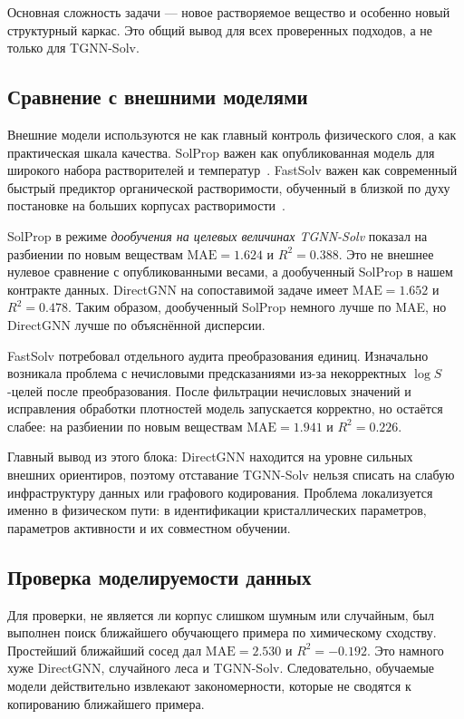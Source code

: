 \documentclass[11pt]{article}
\newcommand{\mae}{\mathrm{MAE}}
\newcommand{\Rtwo}{R^2}
\theoremstyle{definition}
\begin{document}
Основная сложность задачи --- новое растворяемое вещество и особенно новый структурный каркас. Это общий вывод для всех проверенных подходов, а не только для TGNN-Solv.

\subsection{Сравнение с внешними моделями}

Внешние модели используются не как главный контроль физического слоя, а как практическая шкала качества. SolProp важен как опубликованная модель для широкого набора растворителей и температур~\cite{vermeire2022}. FastSolv важен как современный быстрый предиктор органической растворимости, обученный в близкой по духу постановке на больших корпусах растворимости~\cite{fastsolv2025}.

SolProp в режиме \emph{дообучения на целевых величинах TGNN-Solv} показал на разбиении по новым веществам $\mae=1.624$ и $\Rtwo=0.388$. Это не внешнее нулевое сравнение с опубликованными весами, а дообученный SolProp в нашем контракте данных. DirectGNN на сопоставимой задаче имеет $\mae=1.652$ и $\Rtwo=0.478$. Таким образом, дообученный SolProp немного лучше по MAE, но DirectGNN лучше по объяснённой дисперсии.

FastSolv потребовал отдельного аудита преобразования единиц. Изначально возникала проблема с нечисловыми предсказаниями из-за некорректных $\log S$-целей после преобразования. После фильтрации нечисловых значений и исправления обработки плотностей модель запускается корректно, но остаётся слабее: на разбиении по новым веществам $\mae=1.941$ и $\Rtwo=0.226$.

Главный вывод из этого блока: DirectGNN находится на уровне сильных внешних ориентиров, поэтому отставание TGNN-Solv нельзя списать на слабую инфраструктуру данных или графового кодирования. Проблема локализуется именно в физическом пути: в идентификации кристаллических параметров, параметров активности и их совместном обучении.

\subsection{Проверка моделируемости данных}

Для проверки, не является ли корпус слишком шумным или случайным, был выполнен поиск ближайшего обучающего примера по химическому сходству. Простейший ближайший сосед дал $\mae=2.530$ и $\Rtwo=-0.192$. Это намного хуже DirectGNN, случайного леса и TGNN-Solv. Следовательно, обучаемые модели действительно извлекают закономерности, которые не сводятся к копированию ближайшего примера.
\end{document}
